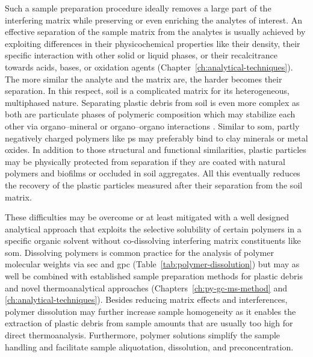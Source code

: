 Such a sample preparation procedure ideally removes a large part of the interfering matrix while preserving or even enriching the analytes of interest.
An effective separation of the sample matrix from the analytes is usually achieved by exploiting differences in their physicochemical properties like their density, their specific interaction with other solid or liquid phases, or their recalcitrance towards acids, bases, or oxidation agents (Chapter~\ref{ch:analytical-techniques}). The more similar the analyte and the matrix are, the harder becomes their separation.
In this respect, soil is a complicated matrix for its heterogeneous, multiphased nature. Separating plastic debris from soil is even more complex as both are particulate phases of polymeric composition which may stabilize each other via organo--mineral or organo--organo interactions \citep{LuoDistribution2020,SchaumannSoil2006}. Similar to \ac{som}, partly negatively charged polymers like \ac{ps} may preferably bind to clay minerals or metal oxides. In addition to those structural and functional similarities, plastic particles may be physically protected from separation if they are coated with natural polymers and biofilms or occluded in soil aggregates. All this eventually reduces the recovery of the plastic particles measured after their separation from the soil matrix.

These difficulties may be overcome or at least mitigated with a well designed analytical approach that exploits the selective solubility of certain polymers in a specific organic solvent without co-dissolving interfering matrix constituents like \ac{som}. Dissolving polymers is common practice for the analysis of polymer molecular weights via \ac{sec} and \ac{gpc} (Table~\ref{tab:polymer-dissolution}) but may as well be combined with established sample preparation methods for plastic debris and novel thermoanalytical approaches (Chapters~\ref{ch:py-gc-ms-method} and \ref{ch:analytical-techniques}). Besides reducing matrix effects and interferences, polymer dissolution may further increase sample homogeneity as it enables the extraction of plastic debris from sample amounts that are usually too high for direct thermoanalysis. Furthermore, polymer solutions simplify the sample handling and facilitate sample aliquotation, dissolution, and preconcentration.

